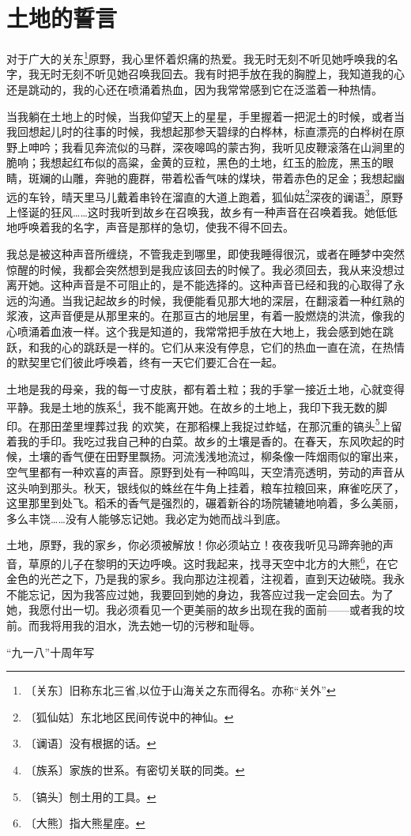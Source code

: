\documentclass[12pt,UTF-8,openany]{ctexbook}
\begin{document}
\chapter{土地的誓言}

\begin{normalsize}
    
    对于广大的关东\footnote{〔关东〕旧称东北三省,以位于山海关之东而得名。亦称“关外”}原野，我心里怀着炽痛的热爱。我无时无刻不听见她呼唤我的名字，我无时无刻不听见她召唤我回去。我有时把手放在我的胸膛上，我知道我的心还是跳动的，我的心还在喷涌着热血，因为我常常感到它在泛滥着一种热情。
    
    当我躺在土地上的时候，当我仰望天上的星星，手里握着一把泥土的时候，或者当我回想起儿时的往事的时候，我想起那参天碧绿的白桦林，标直漂亮的白桦树在原野上呻吟；我看见奔流似的马群，深夜嗥鸣的蒙古狗，我听见皮鞭滚落在山涧里的脆响；我想起红布似的高粱，金黄的豆粒，黑色的土地，红玉的脸庞，黑玉的眼睛，斑斓的山雕，奔驰的鹿群，带着松香气味的煤块，带着赤色的足金；我想起幽远的车铃，晴天里马儿戴着串铃在溜直的大道上跑着，狐仙姑\footnote{〔狐仙姑〕东北地区民间传说中的神仙。}深夜的谰语\footnote{〔谰语〕没有根据的话。}，原野上怪诞的狂风……这时我听到故乡在召唤我，故乡有一种声音在召唤着我。她低低地呼唤着我的名字，声音是那样的急切，使我不得不回去。
    
    我总是被这种声音所缠绕，不管我走到哪里，即使我睡得很沉，或者在睡梦中突然惊醒的时候，我都会突然想到是我应该回去的时候了。我必须回去，我从来没想过离开她。这种声音是不可阻止的，是不能选择的。这种声音已经和我的心取得了永远的沟通。当我记起故乡的时候，我便能看见那大地的深层，在翻滚着一种红熟的浆液，这声音便是从那里来的。在那亘古的地层里，有着一股燃烧的洪流，像我的心喷涌着血液一样。这个我是知道的，我常常把手放在大地上，我会感到她在跳跃，和我的心的跳跃是一样的。它们从来没有停息，它们的热血一直在流，在热情的默契里它们彼此呼唤着，终有一天它们要汇合在一起。
    
    土地是我的母亲，我的每一寸皮肤，都有着土粒；我的手掌一接近土地，心就变得平静。我是土地的族系\footnote{〔族系〕家族的世系。有密切关联的同类。}，我不能离开她。在故乡的土地上，我印下我无数的脚印。在那田垄里埋葬过我 的欢笑，在那稻棵上我捉过蚱蜢，在那沉重的镐头\footnote{〔镐头〕刨土用的工具。}上留着我的手印。我吃过我自己种的白菜。故乡的土壤是香的。在春天，东风吹起的时候，土壤的香气便在田野里飘扬。河流浅浅地流过，柳条像一阵烟雨似的窜出来，空气里都有一种欢喜的声音。原野到处有一种鸣叫，天空清亮透明，劳动的声音从这头响到那头。秋天，银线似的蛛丝在牛角上挂着，粮车拉粮回来，麻雀吃厌了，这里那里到处飞。稻禾的香气是强烈的，碾着新谷的场院辘辘地响着，多么美丽，多么丰饶……没有人能够忘记她。我必定为她而战斗到底。
    
    土地，原野，我的家乡，你必须被解放！你必须站立！夜夜我听见马蹄奔驰的声音，草原的儿子在黎明的天边呼唤。这时我起来，找寻天空中北方的大熊\footnote{〔大熊〕指大熊星座。}，在它金色的光芒之下，乃是我的家乡。我向那边注视着，注视着，直到天边破晓。我永不能忘记，因为我答应过她，我要回到她的身边，我答应过我一定会回去。为了她，我愿付出一切。我必须看见一个更美丽的故乡出现在我的面前——或者我的坟前。而我将用我的泪水，洗去她一切的污秽和耻辱。
    
    \hfill “九一八”十周年写
    
\end{normalsize}
\end{document}
